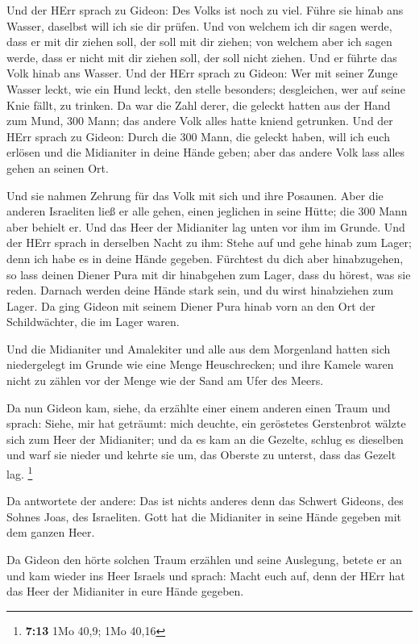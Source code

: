  Und der HErr sprach zu Gideon: Des Volks ist noch zu viel.
Führe sie hinab ans Wasser, daselbst will ich sie dir prüfen. Und von
welchem ich dir sagen werde, dass er mit dir ziehen soll, der soll mit
dir ziehen; von welchem aber ich sagen werde, dass er nicht mit dir
ziehen soll, der soll nicht ziehen.  Und er führte das Volk
hinab ans Wasser. Und der HErr sprach zu Gideon: Wer mit seiner Zunge
Wasser leckt, wie ein Hund leckt, den stelle besonders; desgleichen, wer
auf seine Knie fällt, zu trinken.  Da war die Zahl derer,
die geleckt hatten aus der Hand zum Mund, 300 Mann; das andere Volk
alles hatte kniend getrunken.  Und der HErr sprach zu
Gideon: Durch die 300 Mann, die geleckt haben, will ich euch erlösen und
die Midianiter in deine Hände geben; aber das andere Volk lass alles
gehen an seinen Ort.

 Und sie nahmen Zehrung für das Volk mit sich und ihre
Posaunen. Aber die anderen Israeliten ließ er alle gehen, einen
jeglichen in seine Hütte; die 300 Mann aber behielt er. Und das Heer der
Midianiter lag unten vor ihm im Grunde.  Und der HErr sprach
in derselben Nacht zu ihm: Stehe auf und gehe hinab zum Lager; denn ich
habe es in deine Hände gegeben.  Fürchtest du dich aber
hinabzugehen, so lass deinen Diener Pura mit dir hinabgehen zum Lager,
 dass du hörest, was sie reden. Darnach werden deine Hände
stark sein, und du wirst hinabziehen zum Lager. Da ging Gideon mit
seinem Diener Pura hinab vorn an den Ort der Schildwächter, die im Lager
waren.

 Und die Midianiter und Amalekiter und alle aus dem
Morgenland hatten sich niedergelegt im Grunde wie eine Menge
Heuschrecken; und ihre Kamele waren nicht zu zählen vor der Menge wie
der Sand am Ufer des Meers.

 Da nun Gideon kam, siehe, da erzählte einer einem anderen
einen Traum und sprach: Siehe, mir hat geträumt: mich deuchte, ein
geröstetes Gerstenbrot wälzte sich zum Heer der Midianiter; und da es
kam an die Gezelte, schlug es dieselben und warf sie nieder und kehrte
sie um, das Oberste zu unterst, dass das Gezelt lag. \footnote{\textbf{7:13}
  1Mo 40,9; 1Mo 40,16}

 Da antwortete der andere: Das ist nichts anderes denn das
Schwert Gideons, des Sohnes Joas, des Israeliten. Gott hat die
Midianiter in seine Hände gegeben mit dem ganzen Heer.

 Da Gideon den hörte solchen Traum erzählen und seine
Auslegung, betete er an und kam wieder ins Heer Israels und sprach:
Macht euch auf, denn der HErr hat das Heer der Midianiter in eure Hände
gegeben.

